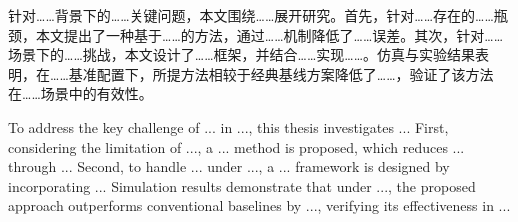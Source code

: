 \begin{chineseabstract}
针对……背景下的……关键问题，本文围绕……展开研究。首先，针对……存在的……瓶颈，本文提出了一种基于……的方法，通过……机制降低了……误差。其次，针对……场景下的……挑战，本文设计了……框架，并结合……实现……。仿真与实验结果表明，在……基准配置下，所提方法相较于经典基线方案降低了……，验证了该方法在……场景中的有效性。

\end{chineseabstract}

\begin{englishabstract}
To address the key challenge of ... in ..., this thesis investigates ... First, considering the limitation of ..., a ... method is proposed, which reduces ... through ... Second, to handle ... under ..., a ... framework is designed by incorporating ... Simulation results demonstrate that under ..., the proposed approach outperforms conventional baselines by ..., verifying its effectiveness in ...

\end{englishabstract}
